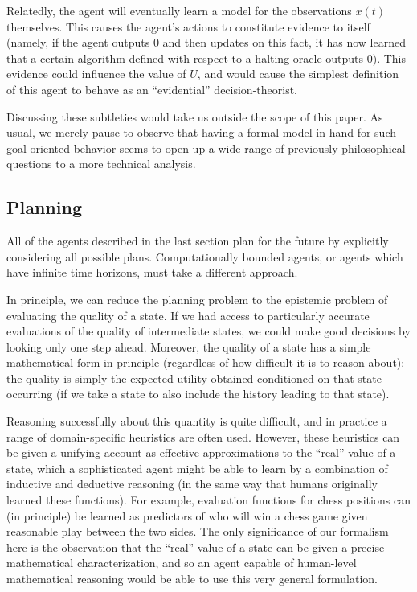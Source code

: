 \documentclass[12pt]{article}
\theoremstyle{definition}
\begin{document}
\begin{itemize}
Relatedly, the agent will eventually learn a model for the observations $x(t)$ themselves.
This causes the agent's actions to constitute evidence to itself (namely,
if the agent outputs $0$ and then updates on this fact, it has now learned
that a certain algorithm defined with respect to a halting oracle outputs 0).
This evidence could influence the value of $U$, and would cause the simplest
definition of this agent to behave as an ``evidential'' decision-theorist.

Discussing these subtleties would take us outside the scope of this paper.
As usual, we merely pause to observe that having a formal model
in hand for such goal-oriented behavior seems to 
open up a wide range of previously philosophical
questions to a more technical analysis.
\end{itemize}

\subsection{Planning}

All of the agents described in the last section
plan for the future by explicitly considering all possible
plans. Computationally bounded agents,
or agents which have infinite time horizons, must take a different approach.

In principle, we can reduce the planning problem to the epistemic
problem of evaluating the quality of a state. If we had access
to particularly accurate evaluations of the quality of intermediate states,
we could make good decisions by looking only one step ahead. %
Moreover, the quality of a state has a simple
mathematical form in principle (regardless of how difficult it is to reason about):
the quality is simply the expected utility obtained conditioned
on that state occurring (if we take a state to also include the history
leading to that state).

Reasoning successfully about this quantity is quite difficult,
and in practice a range of domain-specific heuristics are often used.
However, these heuristics can be given a unifying account
as effective approximations to the ``real'' value of a state,
which a sophisticated agent might be able to learn by a
combination of inductive and deductive reasoning (in the same way
that humans originally learned these functions).
For example, evaluation functions for chess positions
can (in principle) be learned as predictors of who will
win a chess game given reasonable play between the two sides.
The only significance of our formalism here is the observation
that the ``real'' value of a state can be given a precise
mathematical characterization, and so an agent
capable of human-level mathematical reasoning would be able
to use this very general formulation.
\end{document}
